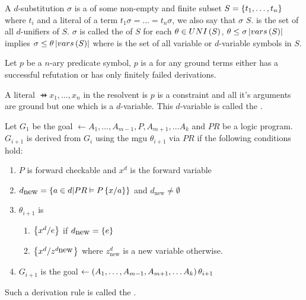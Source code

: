 \begin{defi}
A $d$-substitution $\sigma$ is a  of some non-empty and finite subset $S=\left\{ t_1,\ldots,t_n\right\}$ where $t_i$ and a literal of a term \iffTx{} $t_1\sigma=\ldots=t_n\sigma$, we also say that $\sigma$  $S$.  is the set of all $d$-unifiers of $S$. $\sigma$ is called the  of $S$ \iffTx for each $\theta\in UNI\left(S\right)$, $\theta\leq\sigma\left|vars\left(S\right)\right|$ implies $\sigma\leq\theta\left|vars\left(S\right)\right|$ where  is the set of all variable or $d$-variable symbols in $S$.
\cite{conf/ijcai/Hentenryck87}
\end{defi}

\begin{defi}[Constraint]
Let $p$ be a $n$-ary predicate symbol, $p$ is a  \iffTx for any ground terms either has a successful refutation or has only finitely failed derivations.
\cite{conf/ijcai/Hentenryck87}
\end{defi}

\begin{defi}
A literal $\pfun{x_1,\ldots,x_n}$ in the resolvent is  \iffTx{} $p$ is a constraint and all it's arguments are ground but one which is a $d$-variable. This $d$-variable is called the .
\cite{conf/ijcai/Hentenryck87}
\end{defi}

\begin{defi}
Let $G_1$ be the goal $\leftarrow A_1,\ldots,A_{m-1},P,A_{m+1},\ldots A_k$ and $PR$ be a logic program. $G_{i+1}$ is derived from $G_i$ using the mgu $\theta_{i+1}$ via $PR$ if the following conditions hold:
\begin{enumerate}
 \item $P$ is forward checkable and $x^d$ is the forward variable
 \item $d_{\mbox{new}}=\left\{ a\in d|PR\vDash P\left\{ x/a\right\}\right\}$ and $d_{\mbox{new}}\neq\emptyset$
 \item $\theta_{i+1}$ is
 \begin{enumerate}
  \item $\left\{ x^d/e\right\}$ if $d_{\mbox{new}}=\left\{ e\right\}$
  \item $\left\{ x^d/z^{d_{\mbox{new}}}\right\}$ where $z^d_{\mbox{new}}$ is a new variable otherwise.
 \end{enumerate}
 \item $G_{i+1}$ is the goal $\leftarrow\left( A_1,\ldots,A_{m-1},A_{m+1},\ldots A_k\right)\theta_{i+1}$
\end{enumerate}
Such a derivation rule is called the .
\cite{conf/ijcai/Hentenryck87}
\end{defi}

